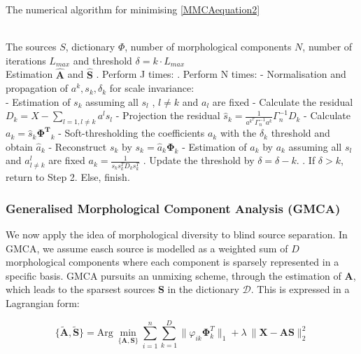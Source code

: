 \begin{algorithm}[H] 
\caption{ The numerical algorithm for minimising \ref{MMCAequation2}} 
\label{alg:Framwork} 
\begin{algorithmic}
\REQUIRE ~~\\%
The sources $S$, dictionary $\Phi$, number of morphological components $N$, number of iterations $L_{max}$ and threshold $\delta = k \cdot L_{max}$
\ENSURE ~~\\ %
Estimation $\hat{\mathbf{A}}$ and $\hat{\mathbf{S}}$
. Perform J times:
\STATE {}. Perform N times:
\STATE \qquad \quad - Normalisation and propagation of $a^k, s_k, \delta_k$ for scale invariance:\\
\STATE \qquad \quad - Estimation of $s_k$ assuming all $s_l$ , $l\neq k$ and $a_l$ are fixed
\STATE \qquad \quad - Calculate the residual $D_k = X - \sum_{l=1,l\neq k} a^ls_l$
\STATE \qquad \quad - Projection the residual $\hat{s}_k = \frac{1}{a^k^T\Gamma_n^{-1}a^k}\Gamma_n^{-1}D_k$
\STATE \qquad \quad - Calculate $a_k = \hat{s}_k \mathbf{\Phi^T}_k$
\STATE \qquad \quad - Soft-thresholding the coefficients $a_k$ with the $\delta_k$ threshold and obtain $\hat{a}_k$
\STATE \qquad \quad - Reconstruct $s_k$ by $s_k = \hat{a}_k \mathbf{\Phi}_k$
\STATE \qquad \quad - Estimation of $a_k$ by $a_k$ assuming all $s_l$ and $a^l_{l \neq k}$ are fixed $a_k = \frac{1}{s_k s_k^T D_ks_k^T}$
. Update the threshold by $\delta = \delta - k$.
. If $\delta  > k$, return to Step 2. Else, finish.
\end{algorithmic}
\end{algorithm}


\subsubsection{Generalised Morphological Component Analysis (GMCA)}
We now apply the idea of morphological diversity to blind source separation. In GMCA, we assume easch source is modelled as a weighted sum of $D$ morphological components where each component is sparsely represented in a specific basis.
GMCA pursuits an unmixing scheme, through the estimation of $\mathbf{A}$, which leads to the sparsest sources $\mathbf{S}$ in the dictionary $\mathcal{D}$. This is expressed in a Lagrangian form:

\begin{equation}
    \{\mathbf{\tilde{A},\tilde{S}}\} = \text{Arg} \: \min_{\{\mathbf{A,S}\}} \sum_{i=1}^n \sum_{k=1}^D \lVert\varphi_{ik} \mathbf{\Phi}_k^T \rVert_{1} + \lambda \:\lVert \mathbf{X} - \mathbf{AS} \rVert^2_2
    \label{GMCAequation}
\end{equation}

